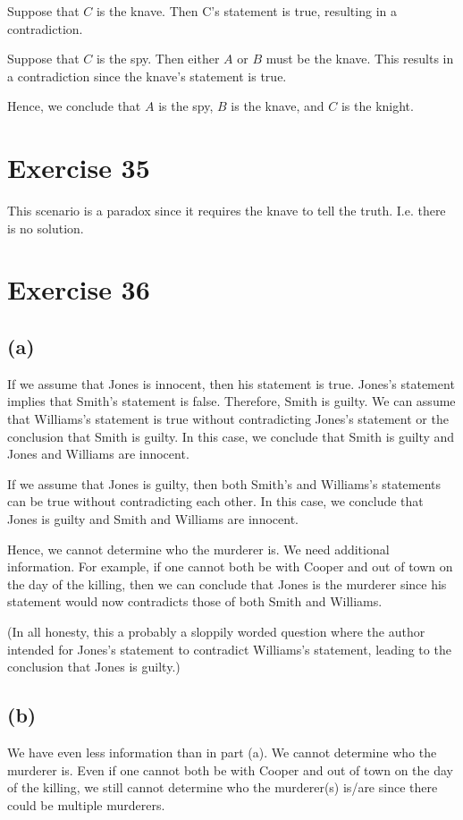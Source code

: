 \documentclass{article}
\begin{document}
Suppose that $C$ is the knave. Then C's statement is true, resulting in a contradiction.

Suppose that $C$ is the spy. Then either $A$ or $B$ must be the knave. This results in a contradiction since the knave's statement is true.

Hence, we conclude that $A$ is the spy, $B$ is the knave, and $C$ is the knight.

\pagebreak

\section{Exercise 35}
This scenario is a paradox since it requires the knave to tell the truth. I.e. there is no solution.

\pagebreak

\section{Exercise 36}

\subsection{(a)}

If we assume that Jones is innocent, then his statement is true. Jones's statement implies that Smith's statement is false. Therefore, Smith is guilty. We can assume that Williams's statement is true without contradicting Jones's statement or the conclusion that Smith is guilty. In this case, we conclude that Smith is guilty and Jones and Williams are innocent.

If we assume that Jones is guilty, then both Smith's and Williams's statements can be true without contradicting each other. In this case, we conclude that Jones is guilty and Smith and Williams are innocent.

Hence, we cannot determine who the murderer is.  We need additional information.  For example, if one cannot both be with Cooper and out of town on the day of the killing, then we can conclude that Jones is the murderer since his statement would now contradicts those of both Smith and Williams.

(In all honesty, this a probably a sloppily worded question where the author intended for Jones's statement to contradict Williams's statement, leading to the conclusion that Jones is guilty.)

\subsection{(b)}
We have even less information than in part (a).  We cannot determine who the murderer is.  Even if one cannot both be with Cooper and out of town on the day of the killing, we still cannot determine who the murderer(s) is/are since there could be multiple murderers.
\end{document}
